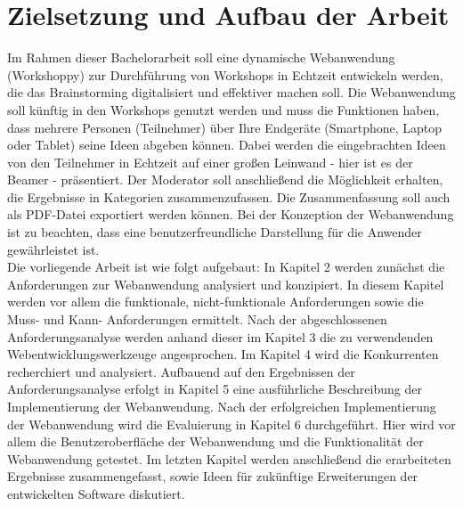 \newpage
\section{Zielsetzung und Aufbau der Arbeit}
\label{subsec:zielsetzung}
Im Rahmen dieser Bachelorarbeit soll eine dynamische Webanwendung (Workshoppy) zur Durchführung von Workshops in Echtzeit entwickeln werden, die das Brainstorming digitalisiert und effektiver machen soll. Die Webanwendung soll künftig in den Workshops genutzt werden und muss die Funktionen haben, dass mehrere Personen (Teilnehmer) über Ihre Endgeräte (Smartphone, Laptop oder Tablet) seine Ideen abgeben können. Dabei werden die eingebrachten Ideen von den Teilnehmer in Echtzeit auf einer großen Leinwand - hier ist es der Beamer - präsentiert. Der Moderator soll anschließend die Möglichkeit erhalten, die Ergebnisse in Kategorien zusammenzufassen. Die Zusammenfassung soll auch als PDF-Datei exportiert werden können. Bei der Konzeption der Webanwendung ist zu beachten, dass eine benutzerfreundliche Darstellung für die Anwender gewährleistet ist.
\\

Die vorliegende Arbeit ist wie folgt aufgebaut: In Kapitel 2 werden zunächst die Anforderungen zur Webanwendung analysiert und konzipiert. In diesem Kapitel werden vor allem die funktionale, nicht-funktionale Anforderungen sowie die Muss- und Kann- Anforderungen ermittelt. Nach der abgeschlossenen Anforderungsanalyse werden anhand dieser im Kapitel 3 die zu verwendenden Webentwicklungswerkzeuge angesprochen. Im Kapitel 4 wird die Konkurrenten recherchiert und analysiert. Aufbauend auf den Ergebnissen der Anforderungsanalyse erfolgt in Kapitel 5 eine ausführliche Beschreibung der Implementierung der Webanwendung. Nach der erfolgreichen Implementierung der Webanwendung wird die Evaluierung in Kapitel 6 durchgeführt. Hier wird vor allem die Benutzeroberfläche der Webanwendung und die Funktionalität der Webanwendung getestet. Im letzten Kapitel werden anschließend die erarbeiteten Ergebnisse zusammengefasst, sowie Ideen für zukünftige Erweiterungen der entwickelten Software diskutiert.
